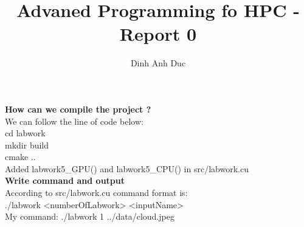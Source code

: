 \documentclass[10pt, a4paper]{article}
\title{Advaned Programming fo HPC - Report 0}
\author{Dinh Anh Duc}
\begin{document}
\maketitle

\textbf{How can we compile the project ?}
\\
We can follow the line of code below:
\\
cd labwork
\\
mkdir build
\\
cmake ..
\\
Added labwork5_GPU() and labwork5_CPU() in src/labwork.cu
\\
\textbf{Write command and output}
\\
According to src/labwork.cu command format is:
\\
./labwork <numberOfLabwork> <inputName>
\\
My command: ./labwork 1 ../data/cloud.jpeg
\end{document}
